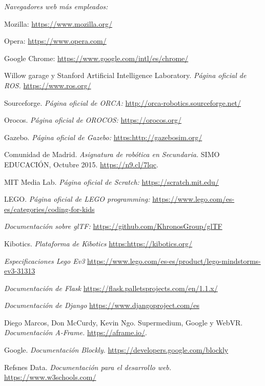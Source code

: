 \begin{thebibliography}{99}

    \textit{Navegadores web más empleados:}

    Mozilla: \url{https://www.mozilla.org/}
    
    Opera: \url{https://www.opera.com/}

    Google Chrome: \url{https://www.google.com/intl/es/chrome/}
    
    Willow garage y Stanford Artificial Intelligence Laboratory.
    \textit{Página oficial de ROS.}
    \url{https://www.ros.org/}
    
    Sourceforge.
    \textit{Página oficial de ORCA:}
    \url{http://orca-robotics.sourceforge.net/}
    
    Orocos.
    \textit{Página oficial de OROCOS:}
    \url{https://orocos.org/}
    
    Gazebo.
    \textit{Página oficial de Gazebo:}
    \url{https:http://gazebosim.org/}
    
    Comunidad de Madrid. %
    \textit{Asignatura de robótica en Secundaria.} %
    SIMO EDUCACIÓN, Octubre 2015. %
    \url{https://n9.cl/7lqc}. %

    MIT Media Lab.
    \textit{Página oficial de Scratch:}
    \url{https://scratch.mit.edu/}
    
    LEGO.
    \textit{Página oficial de LEGO programming:}
    \url{https://www.lego.com/es-es/categories/coding-for-kids}
   
    \textit{Documentación sobre glTF:}
    \url{https://github.com/KhronosGroup/glTF}
    
    Kibotics.
    \textit{Plataforma de Kibotics}
    \url{https:https://kibotics.org/}
    
    \textit{Especificaciones Lego Ev3}
    \url{https://www.lego.com/es-es/product/lego-mindstorms-ev3-31313}
    
    \textit{Documentación de Flask}
    \url{https://flask.palletsprojects.com/en/1.1.x/}
    
    \textit{Documentación de Django}
    \url{https://www.djangoproject.com/es}

    Diego Marcos, Don McCurdy, Kevin Ngo. Supermedium, Google y WebVR.
    \textit{Documentación A-Frame.}
    \url{https://aframe.io/}. 

    Google.
    \textit{Documentación Blockly.}
    \url{https://developers.google.com/blockly}
    
    Refsnes Data.
    \textit{Documentación para el desarrollo web.}
    \url{https://www.w3schools.com/}
    

\end{thebibliography}